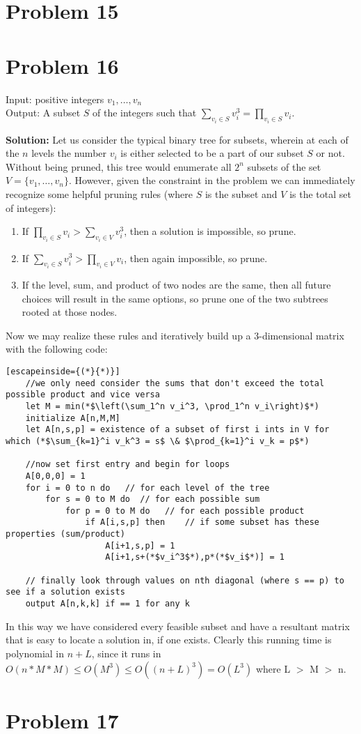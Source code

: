 \documentclass{article}
\providecommand{\prob}[1]{\section*{Problem #1}}
\providecommand{\soln}{\textbf{Solution: }}
\begin{document}
\prob{15}








\prob{16}
Input: positive integers $v_1, \dots , v_n$\\
Output: A subset $S$ of the integers such that $\sum_{v_i \in S}v_i^3 = \prod_{v_i \in S}v_i$.\par \medskip
\soln
Let us consider the typical binary tree for subsets, wherein at each of the $n$ levels the number $v_i$ is either selected to be a part of our subset $S$ or not. Without being pruned, this tree would enumerate all $2^n$ subsets of the set $V = \{v_1,\dots,v_n\}$. However, given the constraint in the problem we can immediately recognize some helpful pruning rules (where $S$ is the subset and $V$ is the total set of integers):\par
\begin{enumerate}
    \item If $\prod_{v_i \in S}v_i > \sum_{v_i \in V}v_i^3$, then a solution is impossible, so prune.
    \item If $\sum_{v_i \in S}v_i^3 > \prod_{v_i \in V}v_i$, then again impossible, so prune.
    \item If the level, sum, and product of two nodes are the same, then all future choices will result in the same options, so prune one of the two subtrees rooted at those nodes.
\end{enumerate}
Now we may realize these rules and iteratively build up a 3-dimensional matrix with the following code:\par
\begin{lstlisting}[escapeinside={(*}{*)}]
    //we only need consider the sums that don't exceed the total possible product and vice versa
    let M = min(*$\left(\sum_1^n v_i^3, \prod_1^n v_i\right)$*)
    initialize A[n,M,M]
    let A[n,s,p] = existence of a subset of first i ints in V for which (*$\sum_{k=1}^i v_k^3 = s$ \& $\prod_{k=1}^i v_k = p$*)

    //now set first entry and begin for loops
    A[0,0,0] = 1
    for i = 0 to n do   // for each level of the tree
        for s = 0 to M do  // for each possible sum
            for p = 0 to M do   // for each possible product
                if A[i,s,p] then    // if some subset has these properties (sum/product)
                    A[i+1,s,p] = 1
                    A[i+1,s+(*$v_i^3$*),p*(*$v_i$*)] = 1

    // finally look through values on nth diagonal (where s == p) to see if a solution exists
    output A[n,k,k] if == 1 for any k
\end{lstlisting}

In this way we have considered every feasible subset and have a resultant matrix that is easy to locate a solution in, if one exists. Clearly this running time is polynomial in $n + L$, since it runs in $O\left(n*M*M\right) \leq O\left(M^3\right) \leq O\left(\left(n+L\right)^3\right) = O\left(L^3\right)$ where L $>$ M $>$ n.


\prob{17}
\end{document}
